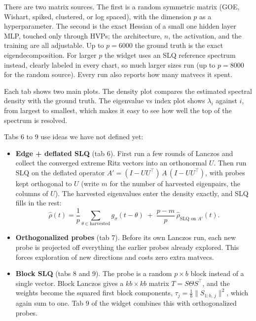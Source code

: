 \documentclass[11pt]{article}
\begin{document}
There are two matrix sources. The first is a random symmetric matrix (GOE, Wishart, spiked, clustered, or log spaced), with the dimension $p$ as a hyperparameter. The second is the exact Hessian of a small one hidden layer MLP, touched only through HVPs; the architecture, $n$, the activation, and the training are all adjustable. Up to $p = 6000$ the ground truth is the exact eigendecomposition. For larger $p$ the widget uses an SLQ reference spectrum instead, clearly labeled in every chart, so much larger sizes run (up to $p = 8000$ for the random source). Every run also reports how many matvecs it spent.

Each tab shows two main plots. The density plot compares the estimated spectral density with the ground truth. The eigenvalue vs index plot shows $\lambda_i$ against $i$, from largest to smallest, which makes it easy to see how well the top of the spectrum is resolved.

Tabs 6 to 9 use ideas we have not defined yet:
\begin{itemize}
  \item \textbf{Edge + deflated SLQ} (tab 6). First run a few rounds of Lanczos and collect the converged extreme Ritz vectors into an orthonormal $U$. Then run SLQ on the deflated operator $A' = (I - UU^\top)\, A\, (I - UU^\top)$, with probes kept orthogonal to $U$ (write $m$ for the number of harvested eigenpairs, the columns of $U$). The harvested eigenvalues enter the density exactly, and SLQ fills in the rest:
  \[
  \hat\rho(t) = \frac{1}{p}\sum_{\theta \in \text{harvested}} g_\sigma(t - \theta) \;+\; \frac{p - m}{p}\, \hat\rho_{\text{SLQ on } A'}(t) .
  \]
  \item \textbf{Orthogonalized probes} (tab 7). Before its own Lanczos run, each new probe is projected off everything the earlier probes already explored. This forces exploration of new directions and costs zero extra matvecs.
  \item \textbf{Block SLQ} (tabs 8 and 9). The probe is a random $p \times b$ block instead of a single vector. Block Lanczos gives a $kb \times kb$ matrix $T = S\Theta S^\top$, and the weights become the squared first block components, $\tau_j = \tfrac{1}{b}\|S_{1:b,\,j}\|^2$, which again sum to one. Tab 9 of the widget combines this with orthogonalized probes.
\end{itemize}
\end{document}
